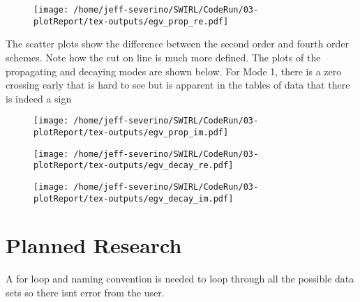 \documentclass[a4paper]{article}
\begin{document}
\begin{figure}
    \centering
    \texttt{[image: /home/jeff-severino/SWIRL/CodeRun/03-plotReport/tex-outputs/egv\_prop\_re.pdf]}
\end{figure}

The scatter plots show the difference between the second order and fourth
order schemes. Note how the cut on line is much more defined. The plots of the propagating 
and decaying modes are shown below. For Mode 1, there is a zero crossing early that
is hard to see but is apparent in the tables of data that there is indeed a sign

 \begin{figure}
     \centering
     \texttt{[image: /home/jeff-severino/SWIRL/CodeRun/03-plotReport/tex-outputs/egv\_prop\_im.pdf]}
 \end{figure}


 \begin{figure}
     \centering
     \texttt{[image: /home/jeff-severino/SWIRL/CodeRun/03-plotReport/tex-outputs/egv\_decay\_re.pdf]}
 \end{figure}


 \begin{figure}
     \centering
     \texttt{[image: /home/jeff-severino/SWIRL/CodeRun/03-plotReport/tex-outputs/egv\_decay\_im.pdf]}
 \end{figure}



\section{Planned Research}
A for loop and naming convention is needed to loop through all the possible data 
sets so there isnt error from the user.
\end{document}
